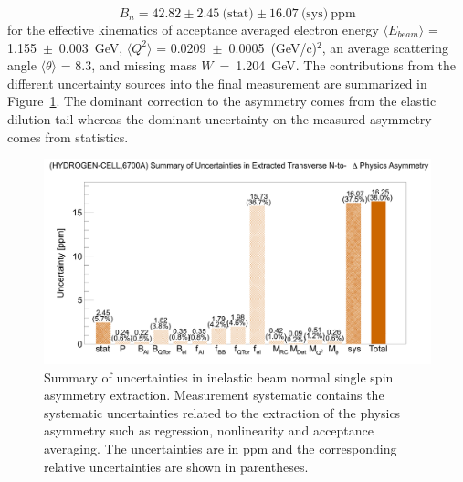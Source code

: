 \begin{equation} \label{equ:FinalResult}
B_{n} = 42.82 \pm 2.45~\text{(stat)} \pm 16.07~\text{(sys)}~\text{ppm}
\end{equation}
for the effective kinematics of acceptance averaged electron energy $\langle E_{beam}\rangle$ = 1.155~$\pm$~0.003~GeV, $\langle Q^{2}\rangle$ = 0.0209~$\pm$~0.0005~(GeV/c)$^{2}$, an average scattering angle $\langle\theta\rangle$ = 8.3\degrees{}, and missing mass $W$~=~1.204~GeV. The contributions from the different uncertainty sources into the final measurement are summarized in Figure~\ref{fig:physicsErrorChart}. The dominant correction to the asymmetry comes from the elastic dilution tail whereas the dominant uncertainty on the measured asymmetry comes from statistics.


\begin{figure}[!h]
	\begin{center}
	\includegraphics[width=15.0cm]{figures/physicsErrorChart}
	\end{center}
	\caption
	{Summary of uncertainties in inelastic beam normal single spin asymmetry extraction. Measurement systematic contains the systematic uncertainties related to the extraction of the physics asymmetry such as regression, nonlinearity and acceptance averaging. The uncertainties are in ppm and the corresponding relative uncertainties are shown in parentheses.}
	\label{fig:physicsErrorChart}
\end{figure}


